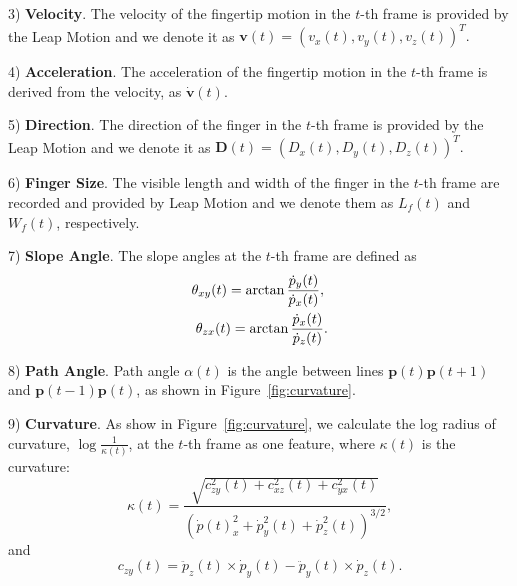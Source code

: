 3) \textbf{Velocity}.
The velocity of the fingertip motion in the $t$-th frame is provided by the Leap Motion
and we denote it as ${{\textbf{v}}}(t) = ({{v}}_x(t),{{v}}_y(t), {{v}}_z(t))^T.$

4) \textbf{Acceleration}.
The acceleration of the fingertip motion in the $t$-th frame
is derived from the velocity, as ${\dot{\textbf{v}}}(t).$

5) \textbf{Direction}.
The direction of the finger in the $t$-th frame is provided by the Leap Motion
and we denote it as ${{\textbf{D}}}(t) = ({{D}}_x(t),{{D}}_y(t), {{D}}_z(t))^T.$

6) \textbf{Finger Size}.
The visible length and width of the finger in the $t$-th frame are recorded and provided by Leap Motion and we denote them as  $L_{f}(t)$
and $W_{f}(t)$, respectively.

7) \textbf{Slope Angle}.
The slope angles at the $t$-th frame are defined as
\begin{align}  \scriptsize
\theta_{xy}(t)=\arctan\frac{{\dot{p}}_y(t)}{{\dot{p}}_x(t)},\notag  \; \\ \notag
\theta_{zx}(t)=\arctan\frac{{\dot{p}}_x(t)}{{\dot{p}}_z(t)}. \notag
\end{align}


8) \textbf{Path Angle}.
Path angle $\alpha(t)$ is the angle between lines $\textbf{p}(t)\textbf{p}(t+1)$ and $\textbf{p}(t-1)\textbf{p}(t)$,
as shown in  Figure~\ref{fig:curvature}.


9) \textbf{Curvature}. As show in Figure~\ref{fig:curvature},
we calculate the log radius of curvature,  $\log \frac{1}{\kappa(t)}$, at the $t$-th frame as one feature,  where $\kappa(t)$ is the curvature:
\vspace{-0mm}
$$
\kappa(t)=\frac{\sqrt{c_{zy}^{2}(t)+c_{xz}^{2}(t)+c_{yx}^{2}(t)}}{({\dot{p}}(t)_x^{2}+{\dot{p}}_y^{2}(t)+{\dot{p}}_z^{2}(t))^{3/2}}, $$
and
$$c_{zy}(t) = {\ddot{p}}_z(t) \times {\dot{p}}_y(t)-{\ddot{p}}_y(t) \times {\dot{p}}_z(t). $$


%
%


